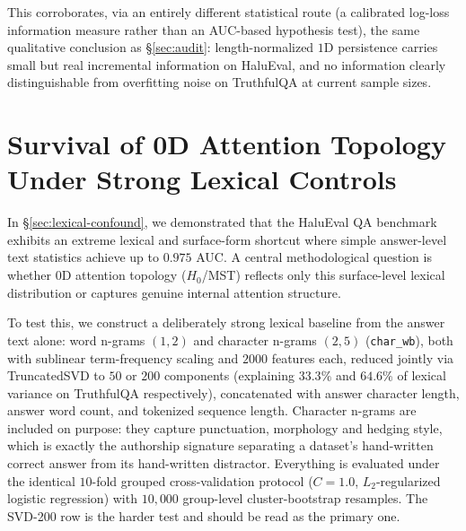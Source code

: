 \documentclass{article}
\begin{document}
This corroborates, via an entirely different statistical route (a calibrated log-loss information measure rather than an AUC-based hypothesis test), the same qualitative conclusion as \S\ref{sec:audit}: length-normalized $1$D persistence carries small but real incremental information on HaluEval, and no information clearly distinguishable from overfitting noise on TruthfulQA at current sample sizes.


\section{Survival of 0D Attention Topology Under Strong Lexical Controls}
\label{app:lex_survival}

In \S\ref{sec:lexical-confound}, we demonstrated that the HaluEval QA benchmark exhibits an extreme lexical and surface-form shortcut where simple answer-level text statistics achieve up to $0.975$ AUC. A central methodological question is whether $0$D attention topology ($H_0$/MST) reflects only this surface-level lexical distribution or captures genuine internal attention structure. 

To test this, we construct a deliberately strong lexical baseline from the answer text alone: word n-grams $(1,2)$ and character n-grams $(2,5)$ (\texttt{char\_wb}), both with sublinear term-frequency scaling and $2000$ features each, reduced jointly via TruncatedSVD to $50$ or $200$ components (explaining $33.3\%$ and $64.6\%$ of lexical variance on TruthfulQA respectively), concatenated with answer character length, answer word count, and tokenized sequence length. Character n-grams are included on purpose: they capture punctuation, morphology and hedging style, which is exactly the authorship signature separating a dataset's hand-written correct answer from its hand-written distractor. Everything is evaluated under the identical $10$-fold grouped cross-validation protocol ($C=1.0$, $L_2$-regularized logistic regression) with $10{,}000$ group-level cluster-bootstrap resamples. The SVD-200 row is the harder test and should be read as the primary one.
\end{document}
